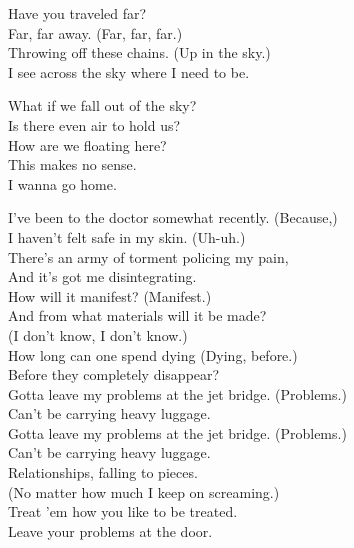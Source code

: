 
Have you traveled far? \\
Far, far away. (Far, far, far.) \\
Throwing off these chains. (Up in the sky.) \\
I see across the sky where I need to be. \\


What if we fall out of the sky? \\
Is there even air to hold us? \\
How are we floating here? \\
This makes no sense. \\
I wanna go home. \\




I've been to the doctor somewhat recently. (Because,) \\
I haven't felt safe in my skin. (Uh-uh.) \\
There's an army of torment policing my pain, \\
And it's got me disintegrating. \\

How will it manifest? (Manifest.) \\
And from what materials will it be made? \\
(I don't know, I don't know.) \\
How long can one spend dying (Dying, before.) \\
Before they completely disappear? \\

Gotta leave my problems at the jet bridge. (Problems.) \\
Can't be carrying heavy luggage. \\
Gotta leave my problems at the jet bridge. (Problems.) \\
Can't be carrying heavy luggage. \\

Relationships, falling to pieces. \\
(No matter how much I keep on screaming.) \\
Treat 'em how you like to be treated. \\
Leave your problems at the door. \\

